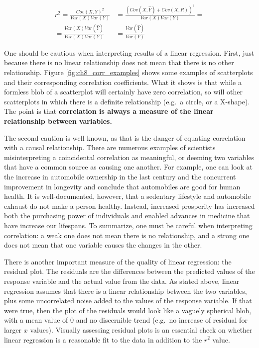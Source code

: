\documentclass[
  letterpaper,
  DIV=11,
  numbers=noendperiod]{scrreprt}
\begin{document}
\begin{equation}
\begin{aligned}
  r^2 = \frac{Cov(X,Y)^2}{Var(X) Var(Y)} &=   \frac{(Cov(X,\hat Y) + Cov(X,R) )^2}{Var(X) Var(Y)}   = \\
  =\frac{Var(X)Var(\hat Y)}{Var(X) Var(Y)} &=  \frac{Var(\hat Y)}{Var(Y)}
  \end{aligned}
\label{eq:ch8_frac_var}
\end{equation}

One should be cautious when interpreting results of a linear regression.
First, just because there is no linear relationship does not mean that
there is no other relationship. Figure \ref{fig:ch8_corr_examples} shows
some examples of scatterplots and their corresponding correlation
coefficients. What it shows is that while a formless blob of a
scatterplot will certainly have zero correlation, so will other
scatterplots in which there is a definite relationship (e.g.~a circle,
or a X-shape). The point is that \textbf{correlation is always a measure
of the linear relationship between variables.}

The second caution is well known, as that is the danger of equating
correlation with a causal relationship. There are numerous examples of
scientists misinterpreting a coincidental correlation as meaningful, or
deeming two variables that have a common source as causing one another.
For example, one can look at the increase in automobile ownership in the
last century and the concurrent improvement in longevity and conclude
that automobiles are good for human health. It is well-documented,
however, that a sedentary lifestyle and automobile exhaust do not make a
person healthy. Instead, increased prosperity has increased both the
purchasing power of individuals and enabled advances in medicine that
have increase our lifespans. To summarize, one must be careful when
interpreting correlation: a weak one does not mean there is no
relationship, and a strong one does not mean that one variable causes
the changes in the other.

There is another important measure of the quality of linear regression:
the  residual
plot. The residuals are the differences between the predicted values of
the response variable and the actual value from the data. As stated
above, linear regression assumes that there is a linear relationship
between the two variables, plus some uncorrelated noise added to the
values of the response variable. If that were true, then the plot of the
residuals would look like a vaguely spherical blob, with a mean value of
0 and no discernible trend (e.g.~no increase of residual for larger
\(x\) values). Visually assessing residual plots is an essential check
on whether linear regression is a reasonable fit to the data in addition
to the \(r^2\) value.
\end{document}
